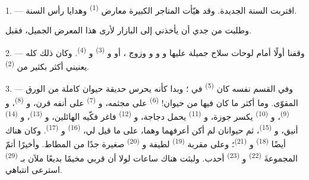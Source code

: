 %

\VUsaut{4.0mm}
\VUsaut{2.0mm}
\VUsaut{3.4mm}

1. --- اقتربت السنة الجديدة. وقد هيّأت المتاجر الكبيرة معارض
 \textsuperscript{(1)} وهدايا رأس السنة.

وطلبت من جدي أن يأخذني إلى البازار لأرى هذا المعرض الجميل، فقبل.

2. --- وقفنا أولًا أمام لوحات سلاح جميلة عليها 
و و و وزوج
، أو  و \textsuperscript{(3)}
و \textsuperscript{(4)}. وكان ذلك كله يعنيني أكثر بكثير من
 \textsuperscript{(2)}.

\VUsaut{3.0mm}
\VUsaut{2.6mm}

3. --- وفي القسم نفسه كان  \textsuperscript{(5)} في ؛
وبدا كأنه يحرس حديقة حيوان كاملة من الورق المقوّى. وما أكثر ما كان فيها
من حيوان!  \textsuperscript{(6)} على مجثمه، و
\textsuperscript{(7)} على أنفه قرن، و \textsuperscript{(8)}،
و \textsuperscript{(9)}، و \textsuperscript{(10)} يكسر
جوزة، و \textsuperscript{(11)} يحمل دجاجة، و
\textsuperscript{(12)} فاغر فكّيه الهائلين، و \textsuperscript{(13)}،
و \textsuperscript{(14)} أنيق، و \textsuperscript{(15)}، ثم
حيوانان لم أكن أعرفهما وهما، على ما قيل لي، 
\textsuperscript{(16)} و \textsuperscript{(17)}. وكان هناك أيضًا
 \textsuperscript{(18)} و \textsuperscript{(21)}؛ وعلى
مقربة  \textsuperscript{(19)} لطيفة و \textsuperscript{(20)}
صغيرة جدًا من المطاط. وأخيرًا أتمّ المجموعةَ 
\textsuperscript{(22)} و \textsuperscript{(23)} أحدب. ولبثت
هناك ساعات لولا أن قربي مخيمًا بديعًا ملآن بـ
\textsuperscript{(29)} استرعى انتباهي.

